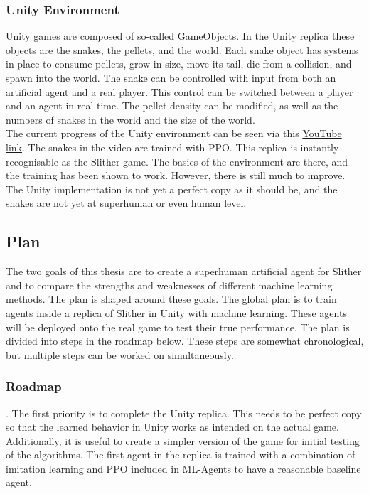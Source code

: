 \subsubsection{Unity Environment}

Unity games are composed of so-called GameObjects. In the Unity replica these objects are the snakes, the pellets, and the world. Each snake object has systems in place to consume pellets, grow in size, move its tail, die from a collision, and spawn into the world. The snake can be controlled with input from both an artificial agent and a real player. This control can be switched between a player and an agent in real-time. The pellet density can be modified, as well as the numbers of snakes in the world and the size of the world.
\\[2.5mm]
The current progress of the Unity environment can be seen via this \href{https://www.youtube.com/shorts/cQYFBBTx3z4}{YouTube link}. The snakes in the video are trained with PPO. This replica is instantly recognisable as the Slither game. The basics of the environment are there, and the training has been shown to work. However, there is still much to improve. The Unity implementation is not yet a perfect copy as it should be, and the snakes are not yet at superhuman or even human level.
\\[-1mm]
\subsection{Plan} %

The two goals of this thesis are to create a superhuman artificial agent for Slither and to compare the strengths and weaknesses of different machine learning methods. The plan is shaped around these goals. The global plan is to train agents inside a replica of Slither in Unity with machine learning. These agents will be deployed onto the real game to test their true performance. The plan is divided into steps in the roadmap below. These steps are somewhat chronological, but multiple steps can be worked on simultaneously. 

\subsubsection{Roadmap}

. The first priority is to complete the Unity replica. This needs to be perfect copy so that the learned behavior in Unity works as intended on the actual game. Additionally, it is useful to create a simpler version of the game for initial testing of the algorithms. The first agent in the replica is trained with a combination of imitation learning and PPO included in ML-Agents to have a reasonable baseline agent. 

